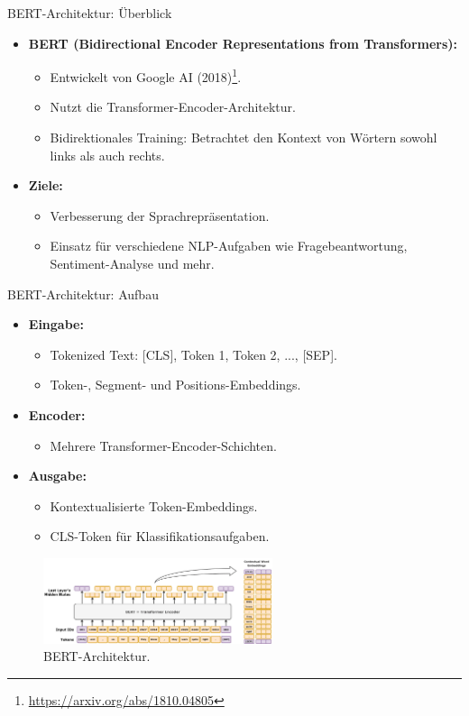 \documentclass[aspectratio=1610, xcolor=dvipsnames, 9pt]{beamer}
\begin{document}
\begin{frame}{BERT-Architektur: Überblick}
  \begin{itemize}
    \item \textbf{BERT (Bidirectional Encoder Representations from Transformers):}
      \begin{itemize}
         \item Entwickelt von Google AI (2018)\footnote{\url{https://arxiv.org/abs/1810.04805}}.
         \item Nutzt die Transformer-Encoder-Architektur.
         \item Bidirektionales Training: Betrachtet den Kontext von Wörtern sowohl links als auch rechts.
      \end{itemize}
    \item \textbf{Ziele:}
      \begin{itemize}
        \item Verbesserung der Sprachrepräsentation.
        \item Einsatz für verschiedene NLP-Aufgaben wie Fragebeantwortung, Sentiment-Analyse und mehr.
      \end{itemize}
  \end{itemize}
\end{frame}

\begin{frame}{BERT-Architektur: Aufbau}
  \begin{itemize}
    \item \textbf{Eingabe:}
      \begin{itemize}
        \item Tokenized Text: [CLS], Token 1, Token 2, ..., [SEP].
        \item Token-, Segment- und Positions-Embeddings.
      \end{itemize}
    \item \textbf{Encoder:}
      \begin{itemize}
        \item Mehrere Transformer-Encoder-Schichten.
      \end{itemize}
    \item \textbf{Ausgabe:}
      \begin{itemize}
        \item Kontextualisierte Token-Embeddings.
        \item CLS-Token für Klassifikationsaufgaben.
      \end{itemize}
  \end{itemize}
  \begin{figure}
    \centering
    \includegraphics[width=0.6\textwidth]{images/BERT_embeddings_01.png}
    \caption{BERT-Architektur.}
  \end{figure}
\end{frame}
\end{document}

